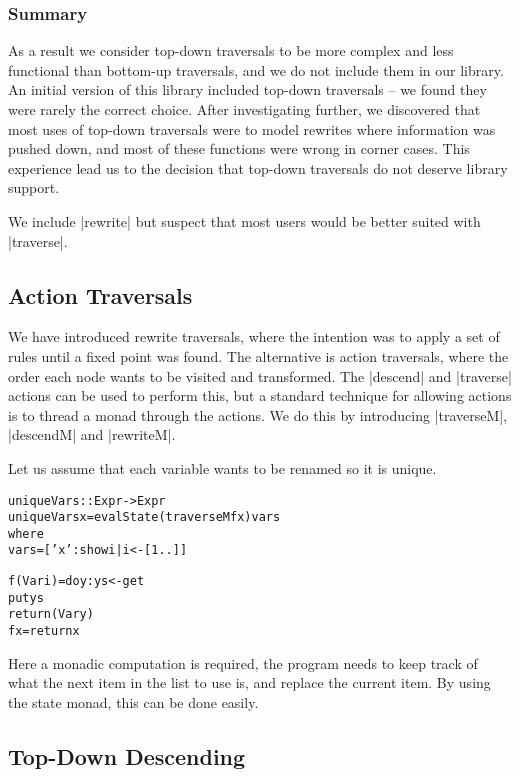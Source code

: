 \documentclass[preprint]{sigplanconf}
\newenvironment{code}{\begin{alltt}\small}{\end{alltt}}
\begin{document}
\subsubsection{Summary}

As a result we consider top-down traversals to be more complex and less functional than bottom-up traversals, and we do not include them in our library. An initial version of this library included top-down traversals -- we found they were rarely the correct choice. After investigating further, we discovered that most uses of top-down traversals were to model rewrites where information was pushed down, and most of these functions were wrong in corner cases. This experience lead us to the decision that top-down traversals do not deserve library support.

We include |rewrite| but suspect that most users would be better suited with |traverse|.


\subsection{Action Traversals}

We have introduced rewrite traversals, where the intention was to apply a set of rules until a fixed point was found. The alternative is action traversals, where the order each node wants to be visited and transformed. The |descend| and |traverse| actions can be used to perform this, but a standard technique for allowing actions is to thread a monad through the actions. We do this by introducing |traverseM|, |descendM| and |rewriteM|.

Let us assume that each variable wants to be renamed so it is unique.

\begin{code}
uniqueVars :: Expr -> Expr
uniqueVars x = evalState (traverseM f x) vars
    where
        vars = ['x':show i | i <- [1..]]

        f (Var i)  = do  y:ys <- get
                         put ys
                         return (Var y)
        f x        = return x
\end{code}

Here a monadic computation is required, the program needs to keep track of what the next item in the list to use is, and replace the current item. By using the state monad, this can be done easily.


\subsection{Top-Down Descending}
\end{document}
